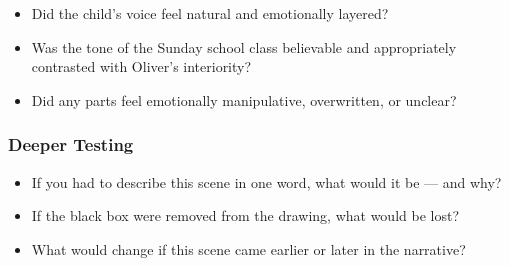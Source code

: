 \begin{itemize}
  \item Did the child’s voice feel natural and emotionally layered?
  \item Was the tone of the Sunday school class believable and appropriately contrasted with Oliver’s interiority?
  \item Did any parts feel emotionally manipulative, overwritten, or unclear?
\end{itemize}

\subsubsection*{Deeper Testing}

\begin{itemize}
  \item If you had to describe this scene in one word, what would it be — and why?
  \item If the black box were removed from the drawing, what would be lost?
  \item What would change if this scene came earlier or later in the narrative?
\end{itemize}
